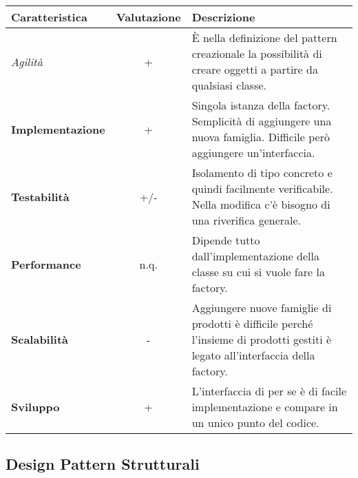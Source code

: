 {{{\begin{itemize}
{					\begin{tabular}{|l|c|l|}
						\hline
						{\textbf{Caratteristica}}&{\textbf{Valutazione}}&{\textbf{Descrizione}}\\
						\hline
						\textit{Agilità} & + & È nella definizione del pattern creazionale la possibilità di creare oggetti a partire da qualsiasi classe. \\
						\hline
						\textbf{Implementazione} & + & Singola istanza della factory. Semplicità di aggiungere una nuova famiglia. Difficile però aggiungere un'interfaccia. \\
						\hline
						\textbf{Testabilità} & +/- & Isolamento di tipo concreto e quindi facilmente verificabile. Nella modifica c'è bisogno di una riverifica generale. \\
						\hline
						\textbf{Performance} & n.q. & Dipende tutto dall'implementazione della classe su cui si vuole fare la factory. \\
						\hline
						\textbf{Scalabilità} & - & Aggiungere nuove famiglie di prodotti è difficile perché l’insieme di prodotti gestiti è legato all'interfaccia della factory. \\
						\hline
						\textbf{Sviluppo} & + & L'interfaccia di per se è di facile implementazione e compare in un unico punto del codice. \\
						\hline
					\end{tabular}
				}
			\end{itemize}
		}	
	}
	\subsection{Design Pattern Strutturali}{
}}

